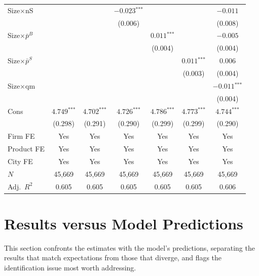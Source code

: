 \documentclass[12pt]{article}
\newcommand{\sym}[1]{\ensuremath{^{\text{#1}}}}
\newcommand{\se}[1]{{\small(#1)}}
\newcommand{\mis}{}
\begin{document}
\begin{table}[H]
\begin{threeparttable}
\begin{tabular}{lcccccc}
      Size\(\times\)nS & \mis & \mis & \(-0.023\sym{***}\) & \mis & \mis & \(-0.011\) \\
                       &     &     & \se{0.006}           &     &     & \se{0.008} \\[4pt]
      Size\(\times\)\(\bar{p}^B\) & \mis & \mis & \mis & \(0.011\sym{***}\) & \mis & \(-0.005\) \\
                                  &     &     &     & \se{0.004}          &     & \se{0.004} \\[4pt]
      Size\(\times\)\(\bar{p}^S\) & \mis & \mis & \mis & \mis & \(0.011\sym{***}\) & \(0.006\) \\
                                  &     &     &     &     & \se{0.003}          & \se{0.004} \\[4pt]
      Size\(\times\)qm & \mis & \mis & \mis & \mis & \mis & \(-0.011\sym{***}\) \\
                       &     &     &     &     &     & \se{0.004} \\[4pt]
      Cons & \(4.749\sym{***}\) & \(4.702\sym{***}\) & \(4.726\sym{***}\) & \(4.786\sym{***}\) & \(4.773\sym{***}\) & \(4.744\sym{***}\) \\
               & \se{0.298} & \se{0.291} & \se{0.290} & \se{0.299} & \se{0.299} & \se{0.290} \\
      \midrule
      Firm FE    & Yes & Yes & Yes & Yes & Yes & Yes \\
      Product FE & Yes & Yes & Yes & Yes & Yes & Yes \\
      City FE    & Yes & Yes & Yes & Yes & Yes & Yes \\
      \(N\)      & 45,669 & 45,669 & 45,669 & 45,669 & 45,669 & 45,669 \\
      Adj.\ \(R^2\) & 0.605 & 0.605 & 0.605 & 0.605 & 0.605 & 0.606 \\
      \bottomrule
    \end{tabular}
  \end{threeparttable}
\end{table}

\section{Results versus Model Predictions}

This section confronts the estimates with the model's predictions, separating the
results that match expectations from those that diverge, and flags the
identification issue most worth addressing.
\end{document}
